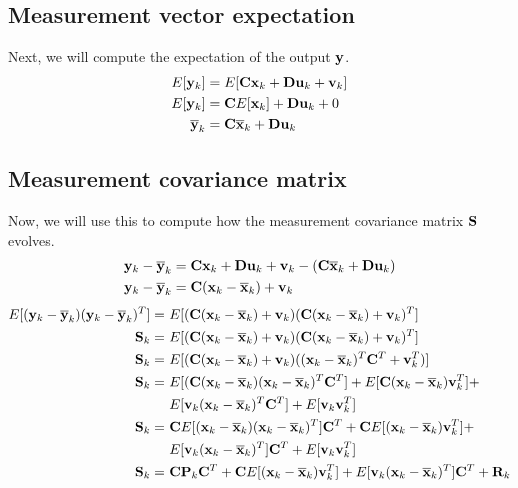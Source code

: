 \subsection{Measurement vector expectation}

Next, we will compute the expectation of the \gls{output} $\mathbf{y}$.
\begin{align*}
  E[\mathbf{y}_k] &= E[\mathbf{C}\mathbf{x}_k + \mathbf{D}\mathbf{u}_k + \mathbf{v}_k] \\
  E[\mathbf{y}_k] &= \mathbf{C}E[\mathbf{x}_k] + \mathbf{D}\mathbf{u}_k + 0 \\
  \overline{\mathbf{y}}_k &= \mathbf{C}\overline{\mathbf{x}}_k + \mathbf{D}\mathbf{u}_k
\end{align*}

\subsection{Measurement covariance matrix}

Now, we will use this to compute how the measurement covariance matrix
$\mathbf{S}$ evolves.
\begin{align*}
  \mathbf{y}_k - \overline{\mathbf{y}}_k &= \mathbf{C}\mathbf{x}_k + \mathbf{D}\mathbf{u}_k + \mathbf{v}_k -
    (\mathbf{C}\overline{\mathbf{x}}_k + \mathbf{D}\mathbf{u}_k) \\
  \mathbf{y}_k - \overline{\mathbf{y}}_k &= \mathbf{C}(\mathbf{x}_k - \overline{\mathbf{x}}_k) + \mathbf{v}_k
\end{align*}
\begin{align*}
  E[(\mathbf{y}_k - \overline{\mathbf{y}}_k)(\mathbf{y}_k - \overline{\mathbf{y}}_k)^T] =~&
    E[(\mathbf{C}(\mathbf{x}_k - \overline{\mathbf{x}}_k) + \mathbf{v}_k)
      (\mathbf{C}(\mathbf{x}_k - \overline{\mathbf{x}}_k) + \mathbf{v}_k)^T] \\
  \mathbf{S}_k =~&
    E[(\mathbf{C}(\mathbf{x}_k - \overline{\mathbf{x}}_k) + \mathbf{v}_k)
      (\mathbf{C}(\mathbf{x}_k - \overline{\mathbf{x}}_k) + \mathbf{v}_k)^T] \\
  \mathbf{S}_k =~&
    E[(\mathbf{C}(\mathbf{x}_k - \overline{\mathbf{x}}_k) + \mathbf{v}_k)
      ((\mathbf{x}_k - \overline{\mathbf{x}}_k)^T\mathbf{C}^T + \mathbf{v}_k^T)] \\
  \mathbf{S}_k =~&
    E[(\mathbf{C}(\mathbf{x}_k - \overline{\mathbf{x}}_k)(\mathbf{x}_k - \overline{\mathbf{x}}_k)^T
      \mathbf{C}^T] +
    E[\mathbf{C}(\mathbf{x}_k - \overline{\mathbf{x}}_k)\mathbf{v}_k^T] + \\
    &E[\mathbf{v}_k(\mathbf{x}_k - \overline{\mathbf{x}}_k)^T\mathbf{C}^T] +
    E[\mathbf{v}_k\mathbf{v}_k^T] \\
  \mathbf{S}_k =~&
    \mathbf{C}E[(\mathbf{x}_k - \overline{\mathbf{x}}_k)(\mathbf{x}_k - \overline{\mathbf{x}}_k)^T]
    \mathbf{C}^T + \mathbf{C}E[(\mathbf{x}_k - \overline{\mathbf{x}}_k)\mathbf{v}_k^T] + \\
    &E[\mathbf{v}_k(\mathbf{x}_k - \overline{\mathbf{x}}_k)^T]\mathbf{C}^T +
    E[\mathbf{v}_k\mathbf{v}_k^T] \\
  \mathbf{S}_k =~& \mathbf{C}\mathbf{P}_k\mathbf{C}^T +
    \mathbf{C}E[(\mathbf{x}_k - \overline{\mathbf{x}}_k)\mathbf{v}_k^T] +
    E[\mathbf{v}_k(\mathbf{x}_k - \overline{\mathbf{x}}_k)^T]\mathbf{C}^T +
    \mathbf{R}_k
\end{align*}

